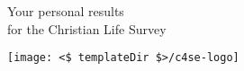 \begin{multicols}{2}
  \begin{flushleft}
    \Huge
    Your personal results\\for the Christian Life Survey
  \end{flushleft}
  \columnbreak
  \texttt{[image: <\$ templateDir \$>/c4se-logo]}
\end{multicols}
